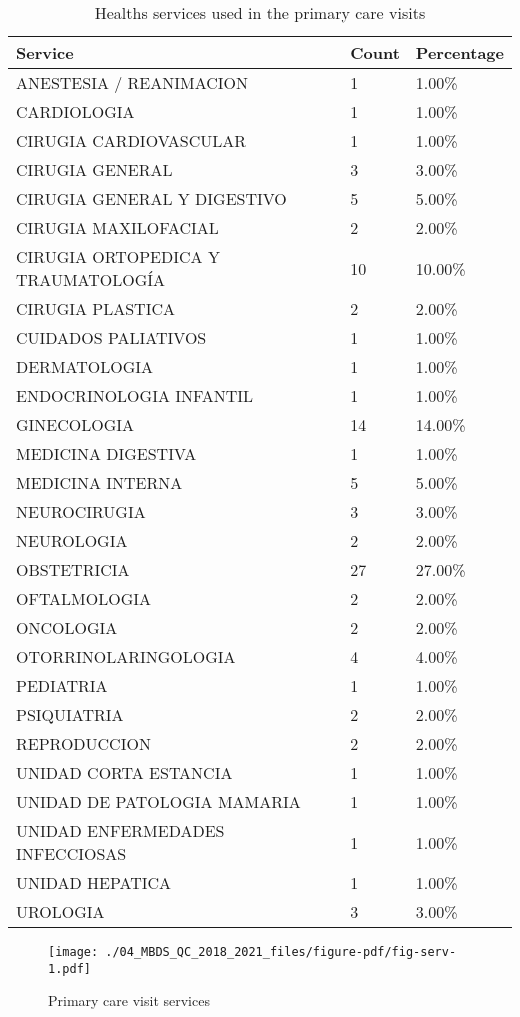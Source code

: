 \documentclass[
  letterpaper,
  DIV=11,
  numbers=noendperiod]{scrreprt}
\begin{document}
\hypertarget{tbl-visit}{}
\begin{longtable}{lll}
\caption{\label{tbl-visit}Healths services used in the primary care visits }\tabularnewline

\toprule
Service & Count & Percentage \\ 
\midrule
ANESTESIA / REANIMACION & 1 & 1.00\% \\ 
CARDIOLOGIA & 1 & 1.00\% \\ 
CIRUGIA CARDIOVASCULAR & 1 & 1.00\% \\ 
CIRUGIA GENERAL & 3 & 3.00\% \\ 
CIRUGIA GENERAL Y DIGESTIVO & 5 & 5.00\% \\ 
CIRUGIA MAXILOFACIAL & 2 & 2.00\% \\ 
CIRUGIA ORTOPEDICA Y TRAUMATOLOGÍA & 10 & 10.00\% \\ 
CIRUGIA PLASTICA & 2 & 2.00\% \\ 
CUIDADOS PALIATIVOS & 1 & 1.00\% \\ 
DERMATOLOGIA & 1 & 1.00\% \\ 
ENDOCRINOLOGIA INFANTIL & 1 & 1.00\% \\ 
GINECOLOGIA & 14 & 14.00\% \\ 
MEDICINA DIGESTIVA & 1 & 1.00\% \\ 
MEDICINA INTERNA & 5 & 5.00\% \\ 
NEUROCIRUGIA & 3 & 3.00\% \\ 
NEUROLOGIA & 2 & 2.00\% \\ 
OBSTETRICIA & 27 & 27.00\% \\ 
OFTALMOLOGIA & 2 & 2.00\% \\ 
ONCOLOGIA & 2 & 2.00\% \\ 
OTORRINOLARINGOLOGIA & 4 & 4.00\% \\ 
PEDIATRIA & 1 & 1.00\% \\ 
PSIQUIATRIA & 2 & 2.00\% \\ 
REPRODUCCION & 2 & 2.00\% \\ 
UNIDAD CORTA ESTANCIA & 1 & 1.00\% \\ 
UNIDAD DE PATOLOGIA MAMARIA & 1 & 1.00\% \\ 
UNIDAD ENFERMEDADES INFECCIOSAS & 1 & 1.00\% \\ 
UNIDAD HEPATICA & 1 & 1.00\% \\ 
UROLOGIA & 3 & 3.00\% \\ 
\bottomrule
\end{longtable}

\begin{figure}

{\centering \texttt{[image: ./04\_MBDS\_QC\_2018\_2021\_files/figure-pdf/fig-serv-1.pdf]}

}

\caption{\label{fig-serv}Primary care visit services}

\end{figure}
\end{document}
